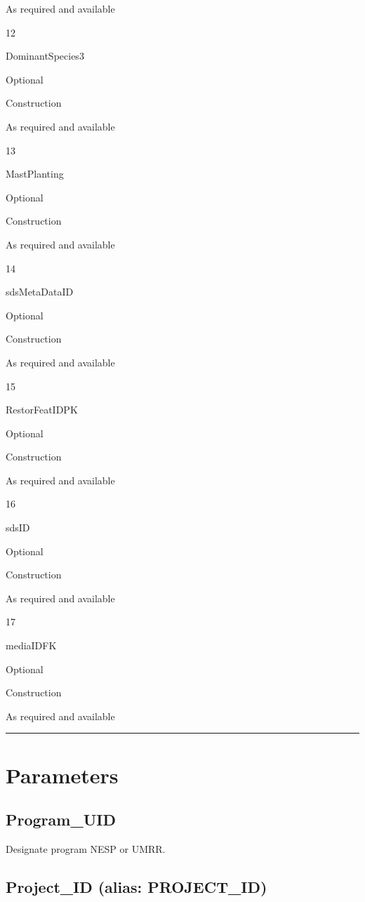 \documentclass[
  letterpaper,
  DIV=11,
  numbers=noendperiod]{scrreprt}
\begin{document}
As required and available

12

DominantSpecies3

Optional

Construction

As required and available

13

MastPlanting

Optional

Construction

As required and available

14

sdsMetaDataID

Optional

Construction

As required and available

15

RestorFeatIDPK

Optional

Construction

As required and available

16

sdsID

Optional

Construction

As required and available

17

mediaIDFK

Optional

Construction

As required and available

\begin{center}\rule{0.5\linewidth}{0.5pt}\end{center}

\section{Parameters}\label{parameters-4}

\subsection{Program\_UID}\label{program_uid-4}

Designate program NESP or UMRR.

\subsection{Project\_ID (alias:
PROJECT\_ID)}\label{project_id-alias-project_id-4}
\end{document}
